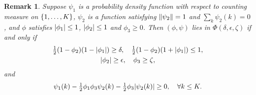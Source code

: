 \documentclass[journal]{IEEEtran}
\newtheorem{remark}{Remark}
\newcommand{\1}{\boldsymbol{1}}
\DeclarePairedDelimiter{\braces}{\{}{\}}
\DeclarePairedDelimiter{\norm}{\lVert}{\rVert}
\DeclarePairedDelimiter{\abs}{\lvert}{\rvert}
\begin{document}
	\begin{remark}
          \label{rem:valid-phis}
          Suppose $\psi_1$ is a probability density function with respect to counting measure on $\braces{1,\dots,K}$, $\psi_2$ is a function satisfying $\norm{\psi_2}=1$ and $\sum_k \psi_2(k)=0$, and $\phi$ satisfies $\abs{\phi_1}\leq 1$, $\abs{\phi_2}\leq 1$ and $\phi_3\geq 0$. Then $(\phi,\psi)$ lies in $\Phi(\delta,\epsilon,\zeta)$ if and only if
          \begin{equation}
            \label{eqn:condition-on-phi}
            \begin{gathered}
              \tfrac{1}{2}(1-\phi_2)(1-\abs{\phi_1})\geq \delta,\quad%
            \tfrac{1}{2}(1-\phi_2)(1+\abs{\phi_1})\leq 1,\\
            \abs{\phi_2}\geq \epsilon,\quad%
            \phi_3\geq \zeta,
            \end{gathered}
          \end{equation}
          and
          \begin{equation}
            \label{eqn:condition-on-psi}
		\psi_1(k)-\tfrac{1}{2}\phi_1\phi_3\psi_2(k)-\tfrac{1}{2}\phi_3 \abs{\psi_2(k)}\geq 0, \quad \forall k\leq K.
	\end{equation}
 \end{remark}
\end{document}
